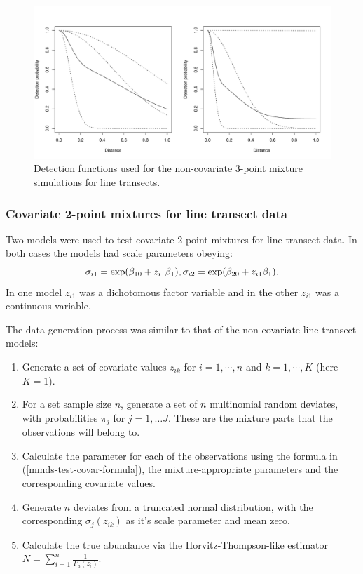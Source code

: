 \begin{figure}
\centering
\includegraphics[width=6in]{mix/figs/3pt-detfcts.pdf}
\caption{Detection functions used for the non-covariate 3-point mixture simulations for line transects.}
\label{mmds-3pt-funcs}
\end{figure}




\subsubsection{Covariate 2-point mixtures for line transect data}

Two models were used to test covariate 2-point mixtures for line transect data. In both cases the models had scale parameters obeying:
\begin{equation}
\sigma_{i1} = \exp(\beta_{10}+z_{i1} \beta_1),\\
\sigma_{i2} = \exp(\beta_{20}+z_{i1} \beta_1).
\label{mmds-test-covar-formula}
\end{equation}
In one model $z_{i1}$ was a dichotomous factor variable and in the other $z_{i1}$ was a continuous variable.

The data generation process was similar to that of the non-covariate line transect models:
\begin{enumerate}
   \item Generate a set of covariate values $z_{ik}$ for $i=1,\cdots,n$ and $k=1,\cdots,K$ (here $K=1$). 
	\item For a set sample size $n$, generate a set of $n$ multinomial random deviates, with probabilities $\pi_j$ for $j=1,\ldots J$. These are the mixture parts that the observations will belong to.
   \item Calculate the parameter for each of the observations using the formula in (\ref{mmds-test-covar-formula}), the mixture-appropriate parameters and the corresponding covariate values.
	\item Generate $n$ deviates from a truncated normal distribution, with the corresponding $\sigma_j(z_{ik})$ as it's scale parameter and mean zero.
	\item Calculate the true abundance via the Horvitz-Thompson-like estimator $N=\sum_{i=1}^n \frac{1}{P_a(z_i)}$.
\end{enumerate}


